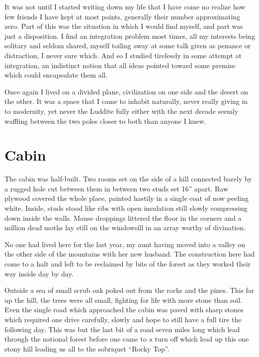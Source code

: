 \documentclass[ebook, 10pt, openright, onecolumn]{memoir}
\newlength{\drop}
\begin{document}
It was not until I started writing down my life that I have come no realize how
few friends I have kept at most points, generally their number approximating
zero.  Part of this was the situation in which I would find myself, and part was
just a disposition.  I find an integration problem most times, all my interests
being solitary and seldom shared, myself toiling away at some talk given as
penance or distraction, I never sure which.  And so I studied tirelessly in some
attempt at integration, an indistinct notion that all ideas pointed toward some
premise which could encapsulate them all. 

Once again I lived on a divided plane, civilization on one side and the desert
on the other.  It was a space that I came to inhabit naturally, never really
giving in to modernity, yet never the Luddite fully either with the next decade
seemly waffling between the two poles closer to both than anyone I knew.  


\chapter{Cabin}
\label{cha:cabin}

The cabin was half-built.  Two rooms set on the side of a hill connected barely
by a rugged hole cut between them in between two studs set 16'' apart.  Raw
plywood covered the whole place, painted hastily in a single coat of now peeling
white.  Inside, studs stood like ribs with open insulation still slowly
compressing down inside the walls.  Mouse droppings littered the floor in the
corners and a million dead moths lay still on the windowsill in an array
worthy of divination.

No one had lived here for the last year, my aunt having moved into a valley on
the other side of the mountains with her new husband.  The construction here had
come to a halt and left to be reclaimed by bits of the forest as they worked
their way inside day by day.  

Outside a sea of small scrub oak poked out from the rocks and the pines.  This
far up the hill, the trees were all small, fighting for life with more stone
than soil.  Even the single road which approached the cabin was paved with sharp
stones which required one drive carefully, slowly and hope to still have a full
tire the following day. This was but the last bit of a road seven miles long
which lead through the national forest before one came to a turn off which lead
up this one stony hill leading us all to the sobriquet ``Rocky Top''.
\end{document}
